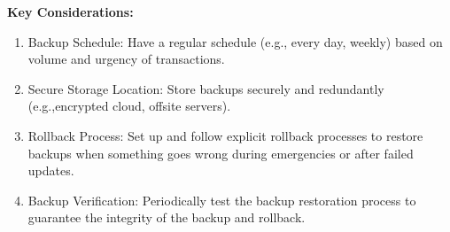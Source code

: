 \documentclass[11pt,a4paper]{article}
\begin{document}
\begin{enumerate}
\begin{minipage}{0.45\textwidth}
    \medskip
    \textbf{Key Considerations:}
    \begin{enumerate}
        \item Backup Schedule: Have a regular schedule (e.g., every day, weekly) based on volume and urgency of transactions.
        \item Secure Storage Location: Store backups securely and redundantly (e.g.,encrypted cloud, offsite servers).
        \item Rollback Process: Set up and follow explicit rollback processes to restore backups when something goes wrong during emergencies or after failed updates.
        \item Backup Verification: Periodically test the backup restoration process to guarantee the integrity of the backup and rollback.
    \end{enumerate}


\end{minipage}
\end{enumerate}
\end{document}
